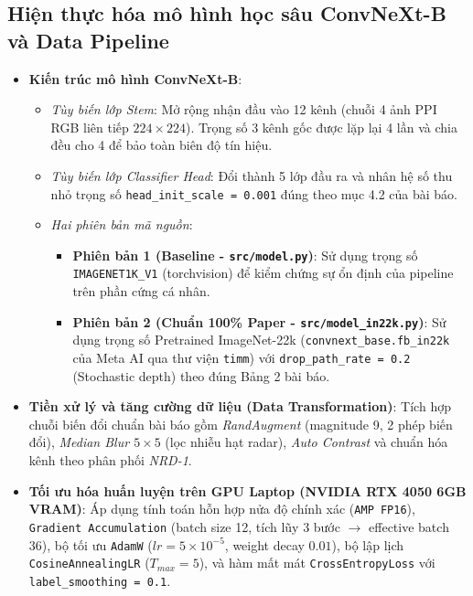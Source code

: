 \documentclass[12pt,a4paper]{article}
\begin{document}
\subsection{Hiện thực hóa mô hình học sâu ConvNeXt-B và Data Pipeline}
\begin{itemize}
    \item \textbf{Kiến trúc mô hình ConvNeXt-B}:
    \begin{itemize}
        \item \textit{Tùy biến lớp Stem}: Mở rộng nhận đầu vào 12 kênh (chuỗi 4 ảnh PPI RGB liên tiếp $224 \times 224$). Trọng số 3 kênh gốc được lặp lại 4 lần và chia đều cho 4 để bảo toàn biên độ tín hiệu.
        \item \textit{Tùy biến lớp Classifier Head}: Đổi thành 5 lớp đầu ra và nhân hệ số thu nhỏ trọng số \texttt{head\_init\_scale = 0.001} đúng theo mục 4.2 của bài báo.
        \item \textit{Hai phiên bản mã nguồn}:
        \begin{itemize}
            \item \textbf{Phiên bản 1 (Baseline - \texttt{src/model.py})}: Sử dụng trọng số \texttt{IMAGENET1K\_V1} (torchvision) để kiểm chứng sự ổn định của pipeline trên phần cứng cá nhân.
            \item \textbf{Phiên bản 2 (Chuẩn 100\% Paper - \texttt{src/model\_in22k.py})}: Sử dụng trọng số Pretrained ImageNet-22k (\texttt{convnext\_base.fb\_in22k} của Meta AI qua thư viện \texttt{timm}) với \texttt{drop\_path\_rate = 0.2} (Stochastic depth) theo đúng Bảng 2 bài báo.
        \end{itemize}
    \end{itemize}
    \item \textbf{Tiền xử lý và tăng cường dữ liệu (Data Transformation)}: Tích hợp chuỗi biến đổi chuẩn bài báo gồm \textit{RandAugment} (magnitude 9, 2 phép biến đổi), \textit{Median Blur $5 \times 5$} (lọc nhiễu hạt radar), \textit{Auto Contrast} và chuẩn hóa kênh theo phân phối \textit{NRD-1}.
    \item \textbf{Tối ưu hóa huấn luyện trên GPU Laptop (NVIDIA RTX 4050 6GB VRAM)}:
    Áp dụng tính toán hỗn hợp nửa độ chính xác (\texttt{AMP FP16}), \texttt{Gradient Accumulation} (batch size 12, tích lũy 3 bước $\to$ effective batch 36), bộ tối ưu \texttt{AdamW} ($lr = 5 \times 10^{-5}$, weight decay $0.01$), bộ lập lịch \texttt{CosineAnnealingLR} ($T_{max} = 5$), và hàm mất mát \texttt{CrossEntropyLoss} với \texttt{label\_smoothing = 0.1}.
\end{itemize}
\end{document}
